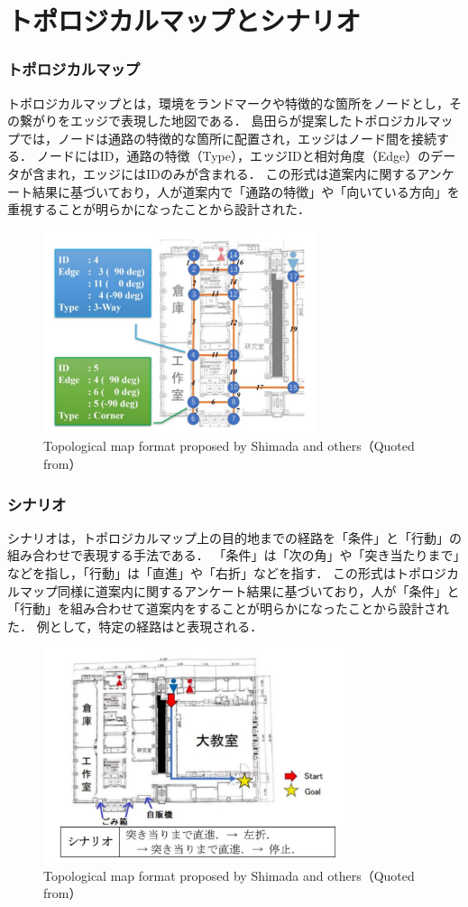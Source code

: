 \section{トポロジカルマップとシナリオ}
\subsubsection{トポロジカルマップ}
トポロジカルマップとは，環境をランドマークや特徴的な箇所をノードとし，その繋がりをエッジで表現した地図である．
島田らが提案したトポロジカルマップでは，ノードは通路の特徴的な箇所に配置され，エッジはノード間を接続する．
ノードにはID，通路の特徴（Type），エッジIDと相対角度（Edge）のデータが含まれ，エッジにはIDのみが含まれる．
この形式は道案内に関するアンケート結果に基づいており，人が道案内で「通路の特徴」や「向いている方向」を重視することが明らかになったことから設計された．

\begin{figure}[htbp]
  \centering
   \includegraphics[width=80mm]{images/pdf/shimada/topo.pdf}
   \caption[Topological map format proposed by Shimada and others]{Topological map format proposed by Shimada and others（Quoted from\cite{shimada2020}）}
   \label{fig:topo}
\end{figure}

\clearpage
\subsubsection{シナリオ}
シナリオは，トポロジカルマップ上の目的地までの経路を「条件」と「行動」の組み合わせで表現する手法である．
「条件」は「次の角」や「突き当たりまで」などを指し，「行動」は「直進」や「右折」などを指す．
この形式はトポロジカルマップ同様に道案内に関するアンケート結果に基づいており，人が「条件」と「行動」を組み合わせて道案内をすることが明らかになったことから設計された．
例として，特定の経路はと表現される．

\begin{figure}[htbp]
  \centering
   \includegraphics[width=90mm]{images/pdf/shimada/scenario.pdf}
   \caption{Topological map format proposed by Shimada and others（Quoted from\cite{shimada2020}）}
   \label{fig:topo}
\end{figure}